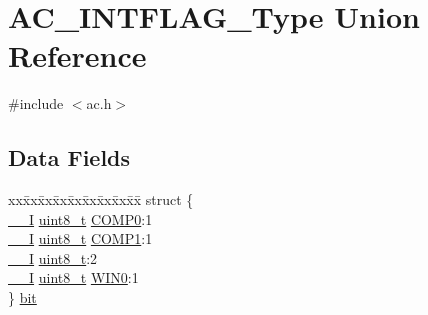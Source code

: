 \hypertarget{union_a_c___i_n_t_f_l_a_g___type}{}\section{A\+C\+\_\+\+I\+N\+T\+F\+L\+A\+G\+\_\+\+Type Union Reference}
\label{union_a_c___i_n_t_f_l_a_g___type}


{\ttfamily \#include $<$ac.\+h$>$}

\subsection*{Data Fields}
\begin{DoxyCompactItemize}
\item 
\begin{tabbing}
xx\=xx\=xx\=xx\=xx\=xx\=xx\=xx\=xx\=\kill
struct \{\\
\>\mbox{\hyperlink{core__cm0plus_8h_af63697ed9952cc71e1225efe205f6cd3}{\_\_I}} \mbox{\hyperlink{union_a_c___i_n_t_f_l_a_g___type_a5b4208c6f4c4a4290c4f2804d1eb1d5b}{uint8\_t}} \mbox{\hyperlink{union_a_c___i_n_t_f_l_a_g___type_a33a6750d17222ca2e7ddb8c9bf6f72ef}{COMP0}}:1\\
\>\mbox{\hyperlink{core__cm0plus_8h_af63697ed9952cc71e1225efe205f6cd3}{\_\_I}} \mbox{\hyperlink{union_a_c___i_n_t_f_l_a_g___type_a5b4208c6f4c4a4290c4f2804d1eb1d5b}{uint8\_t}} \mbox{\hyperlink{union_a_c___i_n_t_f_l_a_g___type_a7b8792327ba01a99c55cf1f02a704f1f}{COMP1}}:1\\
\>\mbox{\hyperlink{core__cm0plus_8h_af63697ed9952cc71e1225efe205f6cd3}{\_\_I}} \mbox{\hyperlink{union_a_c___i_n_t_f_l_a_g___type_a5b4208c6f4c4a4290c4f2804d1eb1d5b}{uint8\_t}}:2\\
\>\mbox{\hyperlink{core__cm0plus_8h_af63697ed9952cc71e1225efe205f6cd3}{\_\_I}} \mbox{\hyperlink{union_a_c___i_n_t_f_l_a_g___type_a5b4208c6f4c4a4290c4f2804d1eb1d5b}{uint8\_t}} \mbox{\hyperlink{union_a_c___i_n_t_f_l_a_g___type_a856111d8065c616bc370ee817fc53491}{WIN0}}:1\\
\} \mbox{\hyperlink{union_a_c___i_n_t_f_l_a_g___type_ac220704caa5ed1c3d7144b97e7cf19ce}{bit}}\\


\end{tabbing}
\end{DoxyCompactItemize}
